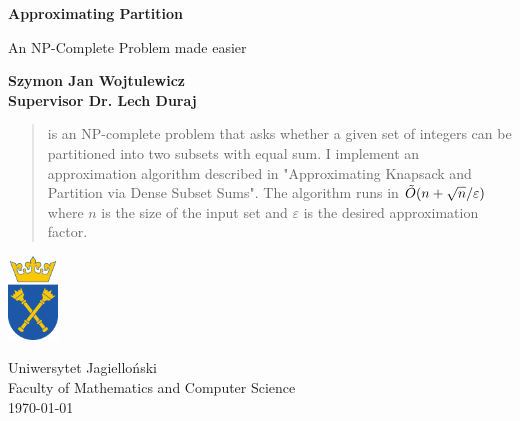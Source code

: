 \begin{titlepage}
    \begin{center}
        \vspace*{1cm}
        
        \Huge
        \textbf{Approximating Partition}
        
        \vspace{0.5cm}
        \LARGE
        An NP-Complete Problem made easier
        
        \vspace{1.5cm}
        
        \small
        \textbf{Szymon Jan Wojtulewicz} \\
        \small
        \textbf{Supervisor Dr. Lech Duraj}

        \vspace{2cm}

        \begin{abstract}
            \Partition is an NP-complete \cite{eshard} problem that asks whether a given set of integers can be partitioned into two subsets with equal sum. I implement an approximation algorithm described in "Approximating Knapsack and Partition via Dense Subset Sums"\cite{deng}. The algorithm runs in $\tilde{O}(n + \sqrt{n}/\varepsilon)$ where $n$ is the size of the input set and $\varepsilon$ is the desired approximation factor.
        \end{abstract}
        
        
        \vfill
        
        
        \includegraphics[width=0.1\textwidth]{university_logo.png}
        
        \vspace{0.8cm}
        \Large
        Uniwersytet Jagielloński\\
        Faculty of Mathematics and Computer Science\\
        \today
        
    \end{center}
\end{titlepage}
